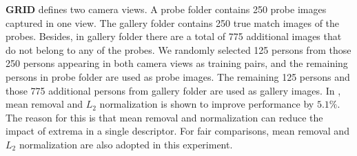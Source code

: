 \documentclass[10pt,twocolumn,letterpaper]{article}
\begin{document}
\textbf{GRID} defines two camera views. A probe folder contains 250 probe images captured in one view. The gallery folder contains 250 true match images of the probes. Besides, in gallery folder there are a total of 775 additional images that do not belong to any of the probes. We randomly selected 125 persons from those 250 persons appearing in both camera views as training pairs, and the remaining persons in probe folder are used as probe images. The remaining 125 persons and those 775 additional persons from gallery folder are used as gallery images. 
In \cite{GOG}, mean removal and $L_2$  normalization is shown to improve performance by $5.1\%$. The reason for this is that mean removal and normalization can reduce the impact of extrema in a single descriptor. For fair comparisons, mean removal and $L_2$ normalization are also adopted in this experiment. 
\end{document}
